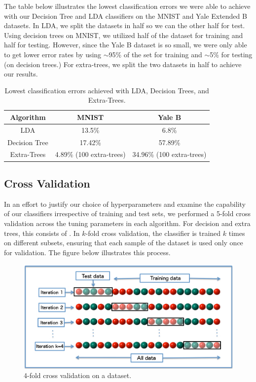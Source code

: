 \label{sec:results}
The table below illustrates the lowest classification errors we were able to achieve with our Decision Tree and LDA classifiers on the MNIST and Yale Extended B datasets. In LDA, we split the datasets in half so we can the other half for test. Using decision trees on MNIST, we utilized half of the dataset for training and half for testing. However, since the Yale B dataset is so small, we were only able to get lower error rates by using $\sim$95\% of the set for training and $\sim$5\% for testing (on decision trees.) For extra-trees, we split the two datasets in half to achieve our results.

\begin{table}[H]
  \centering
  \begin{tabular}{||c | c | c||} 
    \hline
    Algorithm & MNIST & Yale B \\
    \hline\hline
    LDA & 13.5\%  & 6.8\% \\ 
    \hline
    Decision Tree & 17.42\% & 57.89\% \\ 
    \hline
    Extra-Trees & 4.89\% (100 extra-trees) & 34.96\% (100 extra-trees) \\
    \hline
  \end{tabular}
  \caption{Lowest classification errors achieved with LDA, Decision Trees, and Extra-Trees.}
\end{table}

\subsection{Cross Validation}

In an effort to justify our choice of hyperparameters and examine the capability of our classifiers irrespective of training and test sets, we performed a 5-fold cross validation across the tuning parameters in each algorithm. For decision and extra trees, this consists of . In $k$-fold cross validation, the classifier is trained $k$ times on different subsets, ensuring that each sample of the dataset is used only once for validation. The figure below illustrates this process. 
%
\begin{figure}[H]
  \centering\includegraphics[width=0.6\columnwidth]{../images/K-fold_cross_validation_EN}
  \caption{4-fold cross validation on a dataset.}
\end{figure}
 
